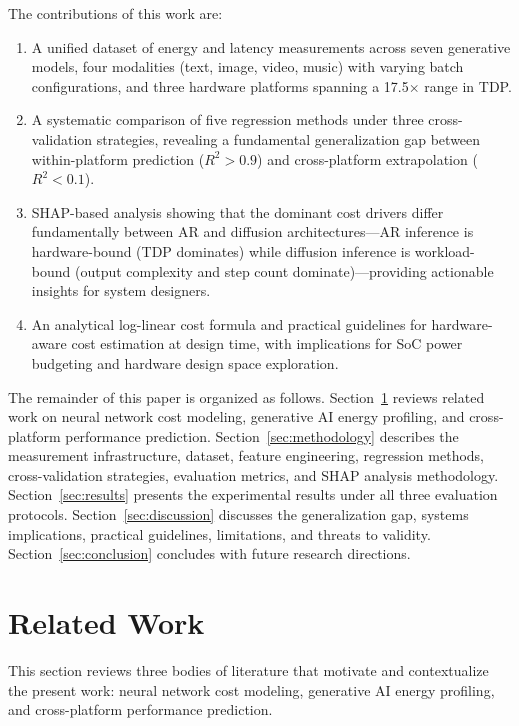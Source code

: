 \documentclass[review,12pt,authoryear]{elsarticle}
\begin{document}
The contributions of this work are:
\begin{enumerate}
\item A unified dataset of \unskip{} energy and latency measurements across seven generative models, four modalities (text, image, video, music) with varying batch configurations, and three hardware platforms spanning a 17.5$\times$ range in TDP.
\item A systematic comparison of five regression methods under three cross-validation strategies, revealing a fundamental generalization gap between within-platform prediction ($R^2 {>} 0.9$) and cross-platform extrapolation ($R^2 {<} 0.1$).
\item SHAP-based analysis showing that the dominant cost drivers differ fundamentally between AR and diffusion architectures---AR inference is hardware-bound (TDP dominates) while diffusion inference is workload-bound (output complexity and step count dominate)---providing actionable insights for system designers.
\item An analytical log-linear cost formula and practical guidelines for hardware-aware cost estimation at design time, with implications for SoC power budgeting and hardware design space exploration.
\end{enumerate}

The remainder of this paper is organized as follows.
Section~\ref{sec:related_work} reviews related work on neural network cost modeling, generative AI energy profiling, and cross-platform performance prediction.
Section~\ref{sec:methodology} describes the measurement infrastructure, dataset, feature engineering, regression methods, cross-validation strategies, evaluation metrics, and SHAP analysis methodology.
Section~\ref{sec:results} presents the experimental results under all three evaluation protocols.
Section~\ref{sec:discussion} discusses the generalization gap, systems implications, practical guidelines, limitations, and threats to validity.
Section~\ref{sec:conclusion} concludes with future research directions.


\section{Related Work}
\label{sec:related_work}

This section reviews three bodies of literature that motivate and contextualize the present work: neural network cost modeling, generative AI energy profiling, and cross-platform performance prediction.
\end{document}
